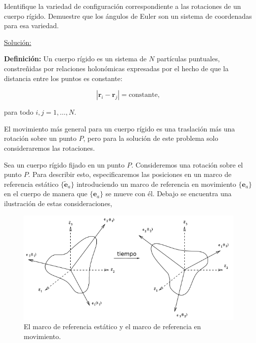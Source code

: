 \documentclass[a4paper,10pt]{article}
\numberwithin{equation}{section}
\newcommand{\definicion}{\textbf{Definición: }}
\begin{document}
Identifique la variedad de configuración correspondiente a las rotaciones de un cuerpo 
rígido. Demuestre que los ángulos de Euler son un sistema de coordenadas para esa 
variedad.

\vspace{.3cm}

\underline{Solución:} \vspace{.3cm}

\definicion Un cuerpo rígido es un sistema de $N$ partículas puntuales, constreñidas 
por relaciones holonómicas expresadas por el hecho de que la distancia entre los 
puntos es constante:

\begin{equation}
 |\mathbf{r}_i - \mathbf{r}_j| = \text{constante},
\end{equation}

para todo $i,j = 1,\dots,N$.

\vspace{.3cm}

El movimiento más general para un cuerpo rígido es una traslación más una rotación 
sobre un punto $P$, pero para la solución de este problema solo consideraremos las 
rotaciones.

\vspace{.3cm}

Sea un cuerpo rígido fijado en un punto $P$. Consideremos una rotación sobre el punto 
$P$. Para describir esto, especificaremos las posiciones en un marco de referencia 
estático $\{{\tilde{\mathbf{e}}_a\}}$ introduciendo un marco de referencia en movimiento $\{{\mathbf{e}_a}\}$
en el cuerpo de manera que $\{\mathbf{e}_a\}$ se mueve con él. Debajo se encuentra una 
ilustración de estas consideraciones,

\begin{figure}[H]
 \center 
 \includegraphics[scale=0.6]{problema5fig1}
 \caption{El marco de referencia estático y el marco de referencia en movimiento.}
\end{figure}
\end{document}
